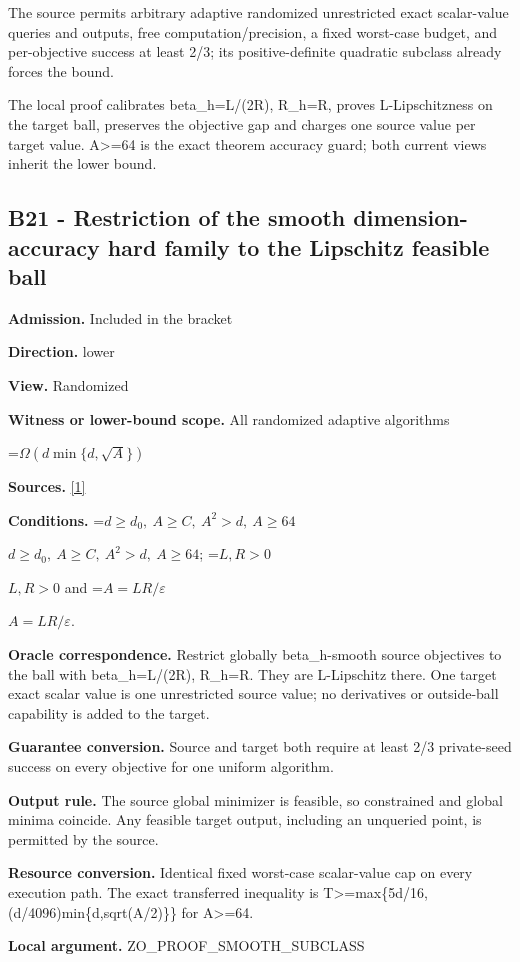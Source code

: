 \documentclass[10pt,a4paper]{article}
\newcommand{\AtlasMath}[1]{\par\begingroup\centering\setbox0=\hbox{$\displaystyle #1$}\ifdim\wd0>1.4\linewidth\typeout{ATLAS WIDE FORMULA: \the\wd0}\fi\ifdim\wd0>\linewidth\resizebox{\linewidth}{!}{\box0}\else\box0\fi\par\endgroup}
\newcommand{\AtlasInlineMath}[1]{\begingroup\setbox0=\hbox{$#1$}\ifdim\wd0>.4\linewidth\endgroup\AtlasMath{#1}\else\endgroup$#1$\fi}
\begin{document}
The source permits arbitrary adaptive randomized unrestricted exact scalar-value queries and outputs, free computation/precision, a fixed worst-case budget, and per-objective success at least 2/3; its positive-definite quadratic subclass already forces the bound.

The local proof calibrates beta\_\allowbreak{}h=L/(2R), R\_\allowbreak{}h=R, proves L-Lipschitzness on the target ball, preserves the objective gap and charges one source value per target value. A>=64 is the exact theorem accuracy guard; both current views inherit the lower bound.

\subsection{B21 - Restriction of the smooth dimension-accuracy hard family to the Lipschitz feasible ball}
\textbf{Admission.} Included in the bracket

\textbf{Direction.} lower

\textbf{View.} Randomized

\textbf{Witness or lower-bound scope.} All randomized adaptive algorithms

\AtlasMath{\Omega(d\min\{d,\sqrt A\})}
\textbf{Sources.} \href{https://arxiv.org/html/2610.00345v1}{[1]}

\textbf{Conditions.} \AtlasInlineMath{d\ge d_0,\ A\ge C,\ A^2>d,\ A\ge64}; \AtlasInlineMath{L,R>0} and \AtlasInlineMath{A=LR/\varepsilon}.

\textbf{Oracle correspondence.} Restrict globally beta\_\allowbreak{}h-smooth source objectives to the ball with beta\_\allowbreak{}h=L/(2R), R\_\allowbreak{}h=R. They are L-Lipschitz there. One target exact scalar value is one unrestricted source value; no derivatives or outside-ball capability is added to the target.

\textbf{Guarantee conversion.} Source and target both require at least 2/3 private-seed success on every objective for one uniform algorithm.

\textbf{Output rule.} The source global minimizer is feasible, so constrained and global minima coincide. Any feasible target output, including an unqueried point, is permitted by the source.

\textbf{Resource conversion.} Identical fixed worst-case scalar-value cap on every execution path. The exact transferred inequality is T>=max\{5d/16,(d/4096)min\{d,sqrt(A/2)\}\} for A>=64.

\textbf{Local argument.} ZO\_\allowbreak{}PROOF\_\allowbreak{}SMOOTH\_\allowbreak{}SUBCLASS
\end{document}
